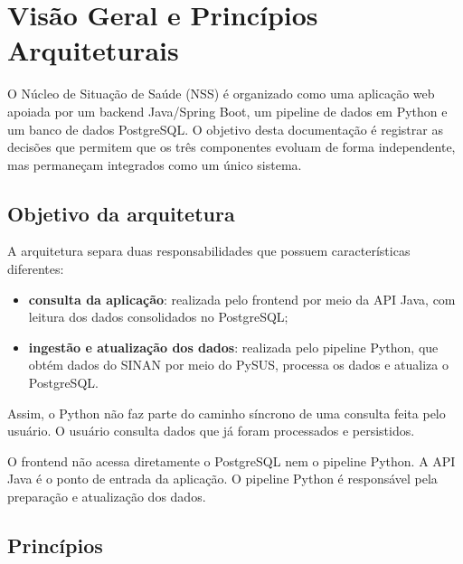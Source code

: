 \section{Visão Geral e Princípios Arquiteturais}

O Núcleo de Situação de Saúde (NSS) é organizado como uma aplicação web apoiada por um backend Java/Spring Boot, um pipeline de dados em Python e um banco de dados PostgreSQL. O objetivo desta documentação é registrar as decisões que permitem que os três componentes evoluam de forma independente, mas permaneçam integrados como um único sistema.

\subsection{Objetivo da arquitetura}

A arquitetura separa duas responsabilidades que possuem características diferentes:

\begin{itemize}
    \item \textbf{consulta da aplicação}: realizada pelo frontend por meio da API Java, com leitura dos dados consolidados no PostgreSQL;
    \item \textbf{ingestão e atualização dos dados}: realizada pelo pipeline Python, que obtém dados do SINAN por meio do PySUS, processa os dados e atualiza o PostgreSQL.
\end{itemize}

Assim, o Python não faz parte do caminho síncrono de uma consulta feita pelo usuário. O usuário consulta dados que já foram processados e persistidos.

\begin{regra}
O frontend não acessa diretamente o PostgreSQL nem o pipeline Python. A API Java é o ponto de entrada da aplicação. O pipeline Python é responsável pela preparação e atualização dos dados.
\end{regra}

\subsection{Princípios}

